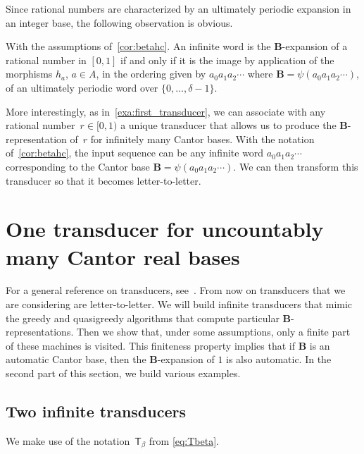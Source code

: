 \documentclass[12pt,reqno]{amsart}
\newcommand{\B}{{\mathbf{B}}}
\begin{document}
Since rational numbers are characterized by an ultimately periodic expansion in an integer base, the following observation is obvious. 
\begin{corollary}
    With the assumptions of~\cref{cor:betahc}. An infinite word is the $\B$-expansion of a rational number in $[0,1]$ if and only if it is the image by application of the morphisms $h_a$, $a\in A$, in the ordering given by $a_0a_1a_2\cdots$ where $\B=\psi(a_0a_1a_2\cdots)$, of an ultimately periodic word over $\{0,\ldots,\delta-1\}$.
\end{corollary}

More interestingly, as in~\cref{exa:first_transducer}, we can associate with any rational number~$r\in [0,1)$ a unique transducer that allows us to produce the $\B$-representation of~$r$ for infinitely many Cantor bases. With the notation of~\cref{cor:betahc}, the input sequence can be any infinite word $a_0a_1a_2\cdots$ corresponding to the Cantor base $\B=\psi(a_0a_1a_2\cdots)$. We can then transform this transducer so that it becomes letter-to-letter. 








\section{One transducer for uncountably many Cantor real bases}\label{sec:main_transducer}

For a general reference on transducers, see~\cite{Saka}. From now on  transducers that we are considering are letter-to-letter. We will build infinite transducers that mimic the greedy and quasigreedy algorithms that compute particular $\B$-representations. Then we show that, under some assumptions, only a finite part of these machines is visited. This finiteness property implies that if $\B$ is an automatic Cantor base, then the $\B$-expansion of $1$ is also automatic. In the second part of this section, we build various examples.

\subsection{Two infinite transducers}
We make use of the notation~$\mathsf{T}_\beta$ from \eqref{eq:Tbeta}.
\end{document}
